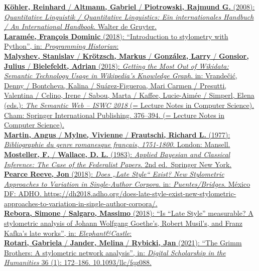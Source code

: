 \documentclass[
  letterpaper,
  DIV=11,
  numbers=noendperiod]{scrreprt}
\begin{document}
\href{https://www.zotero.org/google-docs/?4xA93b}{\textbf{Köhler,
Reinhard} / \textbf{Altmann, Gabriel} / \textbf{Piotrowski, Rajmund G.}
(2008): \emph{Quantitative Linguistik / Quantitative Linguistics: Ein
internationales Handbuch / An International Handbook}. Walter de
Gruyter.}\\
\href{https://www.zotero.org/google-docs/?4xA93b}{\textbf{Laramée,
François Dominic} (2018): ``Introduction to stylometry with Python'',
in: \emph{Programming Historian}:}\\
\href{https://www.zotero.org/google-docs/?4xA93b}{\textbf{Malyshev,
Stanislav} / \textbf{Krötzsch, Markus} / \textbf{González, Larry} /
\textbf{Gonsior, Julius} / \textbf{Bielefeldt, Adrian} (2018):
\emph{Getting the Most Out of Wikidata: Semantic Technology Usage in
Wikipedia's Knowledge Graph}. in: Vrandečić, Denny / Bontcheva, Kalina /
Suárez-Figueroa, Mari Carmen / Presutti, Valentina / Celino, Irene /
Sabou, Marta / Kaffee, Lucie-Aimée / Simperl, Elena (eds.): \emph{The
Semantic Web -- ISWC 2018} (= Lecture Notes in Computer Science). Cham:
Springer International Publishing. 376--394. (= Lecture Notes in
Computer Science).}\\
\href{https://www.zotero.org/google-docs/?4xA93b}{\textbf{Martin, Angus}
/ \textbf{Mylne, Vivienne} / \textbf{Frautschi, Richard L.} (1977):
\emph{Bibliographie du genre romanesque français, 1751-1800}. London:
Mansell.}\\
\href{https://www.zotero.org/google-docs/?4xA93b}{\textbf{Mosteller, F.}
/ \textbf{Wallace, D. L.} (1983): \emph{Applied Bayesian and Classical
Inference: The Case of the Federalist Papers}. 2nd ed.~Springer New
York.}\\
\href{https://www.zotero.org/google-docs/?4xA93b}{\textbf{Pearce Reeve,
Jon} (2018): \emph{Does „Late Style`` Exist? New Stylometric Approaches
to Variation in Single-Author Corpora}. in: \emph{Puentes/Bridges}.
México DF: ADHO.
https://dh2018.adho.org/does-late-style-exist-new-stylometric-approaches-to-variation-in-single-author-corpora/.}\\
\href{https://www.zotero.org/google-docs/?4xA93b}{\textbf{Rebora,
Simone} / \textbf{Salgaro, Massimo} (2018): ``Is ``Late Style''
measurable? A stylometric analysis of Johann Wolfgang Goethe's, Robert
Musil's, and Franz Kafka's late works'', in: \emph{Elephant\&Castle}:}\\
\href{https://www.zotero.org/google-docs/?4xA93b}{\textbf{Rotari,
Gabriela} / \textbf{Jander, Melina} / \textbf{Rybicki, Jan} (2021):
``The Grimm Brothers: A stylometric network analysis'', in:
\emph{Digital Scholarship in the Humanities} 36 (1): 172--186.
10.1093/llc/fqz088.}\\
\end{document}
